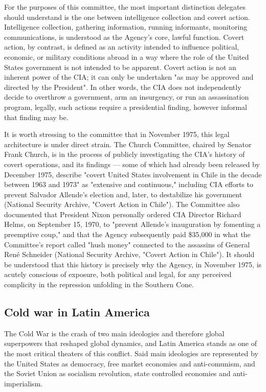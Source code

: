 For the purposes of this committee, the most important distinction delegates should understand is the one between intelligence collection and covert action. Intelligence collection, gathering information, running informants, monitoring communications, is understood as the Agency's core, lawful function. Covert action, by contrast, is defined as an activity intended to influence political, economic, or military conditions abroad in a way where the role of the United States government is not intended to be apparent. Covert action is not an inherent power of the CIA; it can only be undertaken "as may be approved and directed by the President". In other words, the CIA does not independently decide to overthrow a government, arm an insurgency, or run an assassination program, legally, such actions require a presidential finding, however informal that finding may be.

It is worth stressing to the committee that in November 1975, this legal architecture is under direct strain. The Church Committee, chaired by Senator Frank Church, is in the process of publicly investigating the CIA's history of covert operations, and its findings — some of which had already been released by December 1975, describe "covert United States involvement in Chile in the decade between 1963 and 1973" as "extensive and continuous," including CIA efforts to prevent Salvador Allende's election and, later, to destabilize his government (National Security Archive, "Covert Action in Chile"). The Committee also documented that President Nixon personally ordered CIA Director Richard Helms, on September 15, 1970, to "prevent Allende's inauguration by fomenting a preemptive coup," and that the Agency subsequently paid \$35,000 in what the Committee's report called "hush money" connected to the assassins of General René Schneider (National Security Archive, "Covert Action in Chile"). It should be understood that this history is precisely why the Agency, in November 1975, is acutely conscious of exposure, both political and legal, for any perceived complicity in the repression unfolding in the Southern Cone.

\subsection{Cold war in Latin America}

The Cold War is the crash of two main ideologies and therefore global superpowers that reshaped global dynamics, and Latin America stands as one of the most critical theaters of this conflict. Said main ideologies are represented by the United States as democracy, free market economies and anti-comunism, and the Soviet Union as socialism revolution, state controlled economies and anti-imperialism.

